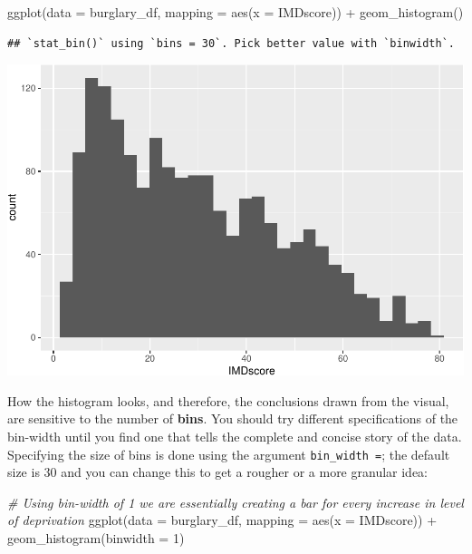 \documentclass[
]{book}
\newenvironment{Shaded}{\begin{snugshade}}{\end{snugshade}}
\newcommand{\AttributeTok}[1]{\textcolor[rgb]{0.77,0.63,0.00}{#1}}
\newcommand{\CommentTok}[1]{\textcolor[rgb]{0.56,0.35,0.01}{\textit{#1}}}
\newcommand{\DecValTok}[1]{\textcolor[rgb]{0.00,0.00,0.81}{#1}}
\newcommand{\FunctionTok}[1]{\textcolor[rgb]{0.00,0.00,0.00}{#1}}
\newcommand{\NormalTok}[1]{#1}
\newcommand{\SpecialCharTok}[1]{\textcolor[rgb]{0.00,0.00,0.00}{#1}}
\begin{document}
\begin{Shaded}
\begin{Highlighting}[]
\FunctionTok{ggplot}\NormalTok{(}\AttributeTok{data =}\NormalTok{ burglary\_df, }\AttributeTok{mapping =} \FunctionTok{aes}\NormalTok{(}\AttributeTok{x =}\NormalTok{ IMDscore)) }\SpecialCharTok{+} 
  \FunctionTok{geom\_histogram}\NormalTok{()}
\end{Highlighting}
\end{Shaded}

\begin{verbatim}
## `stat_bin()` using `bins = 30`. Pick better value with `binwidth`.
\end{verbatim}

\includegraphics{03-data-visualisation_files/figure-latex/unnamed-chunk-18-1.pdf}

How the histogram looks, and therefore, the conclusions drawn from the visual, are sensitive to the number of \textbf{bins}. You should try different specifications of the bin-width until you find one that tells the complete and concise story of the data. Specifying the size of bins is done using the argument \texttt{bin\_width\ =}; the default size is 30 and you can change this to get a rougher or a more granular idea:

\begin{Shaded}
\begin{Highlighting}[]
\CommentTok{\# Using bin{-}width of 1 we are essentially creating a bar for every increase in level of deprivation}
\FunctionTok{ggplot}\NormalTok{(}\AttributeTok{data =}\NormalTok{ burglary\_df, }\AttributeTok{mapping =} \FunctionTok{aes}\NormalTok{(}\AttributeTok{x =}\NormalTok{ IMDscore)) }\SpecialCharTok{+} 
  \FunctionTok{geom\_histogram}\NormalTok{(}\AttributeTok{binwidth =} \DecValTok{1}\NormalTok{)}
\end{Highlighting}
\end{Shaded}
\end{document}
